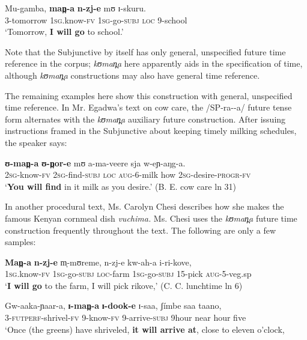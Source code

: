 \documentclass[output=paper]{langsci/langscibook}
\begin{document}
\ea\label{ex:sarvasy:20}
\gll Mu-gamba,   \textbf{man̪-a}    \textbf{n-zj-e}    mʊ  ɪ-skuru. \\
3-tomorrow  \textsc{1sg.}know-\textsc{fv}  \textsc{1sg}-go-\textsc{subj}  \textsc{loc}  9-school \\
\glt ‘Tomorrow, \textbf{I will go} to school.’
\z

Note that the Subjunctive by itself has only general, unspecified future time reference in the corpus; \textit{kʊman̪a} here apparently aids in the specification of time, although \textit{kʊman̪a} constructions may also have general time reference. 

The remaining examples here show this construction with general, unspecified time reference. In {Mr. Egadwa’s} text on cow care, the /SP-ra-{\longrule}-a/ future tense form alternates with the \textit{kʊman̪a} auxiliary future construction. After issuing instructions framed in the Subjunctive about keeping timely milking schedules, the speaker says: 

\ea\label{ex:sarvasy:21}
\gll \textbf{ʊ-man̪-a}   \textbf{ʊ-n̪or-e}     mʊ   a-ma-veere   sja   w-eɲ-aŋg-a. \\
\textsc{2sg-}know-\textsc{fv}  \textsc{2sg}-find-\textsc{subj}  \textsc{loc}  \textsc{aug-}6-milk  how  \textsc{2sg}-desire-\textsc{progr}-\textsc{fv} \\
\glt ‘\textbf{You will find} in it milk as you desire.’ (B. E. cow care ln 31)
\z

In another procedural text, Ms. Carolyn Chesi describes how she makes the famous Kenyan cornmeal dish \textit{vuchima.} Ms. Chesi uses the \textit{kʊman̪a} future time construction frequently throughout the text. The following are only a few samples:

\ea\label{ex:sarvasy:22}
\gll \textbf{Man̪-a}     \textbf{n-zj-e}     m̩-mʊreme,   n-zj-e     kw-ah-a     i-ri-kove, \\
\textsc{1sg}.know-\textsc{fv}  \textsc{1sg}-go-\textsc{subj}  \textsc{loc}-farm  \textsc{1sg}-go-\textsc{subj}  15-pick    \textsc{aug}-5-veg.sp \\
\glt ‘\textbf{I will go} to the farm, I will pick rikove,’ (C. C. lunchtime ln 6)
\z

\ea\label{ex:sarvasy:23}
\gll Gw-aaka-ɲaar-a,   \textbf{ɪ-man̪-a}   \textbf{ɪ-dook-e}   ɪ-saa,   ʃ\'{i}mbe   saa   taano, \\
3-\textsc{futperf-}shrivel-\textsc{fv}  9-know-\textsc{fv}  9-arrive-\textsc{subj}    9hour    near  hour  five \\
\glt ‘Once (the greens) have shriveled, \textbf{it will arrive at}, close to eleven o’clock,
\end{document}
